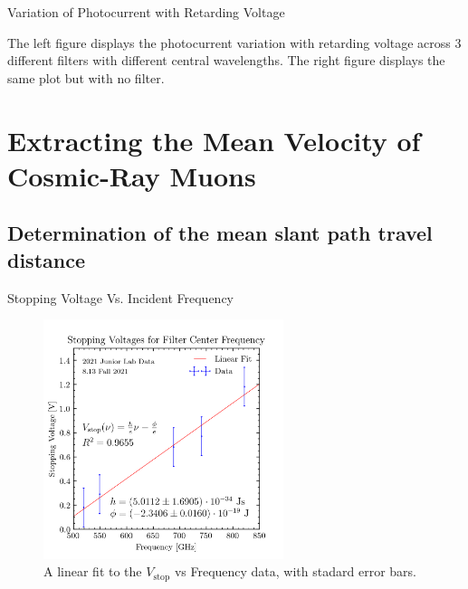 \documentclass[hyperref=pdftex, presentation]{beamer}
\begin{document}
\begin{frame}{Variation of Photocurrent with Retarding Voltage}
\begin{figure}
\begin{minipage}{0.45\textwidth}
	\end{minipage}
\end{figure}
The left figure displays the photocurrent variation with retarding voltage across 3 different filters with different central wavelengths. The right figure displays the same plot but with no filter.
\end{frame}


\section{Extracting the Mean Velocity of Cosmic-Ray Muons}
\subsection{Determination of the mean slant path travel distance}

\begin{frame}{\Large Stopping Voltage Vs. Incident Frequency}
 \begin{figure}
 	\centering
 \includegraphics[height=7cm]{stopping_volts.png}
 \caption{A linear fit to the $V_{\mathrm{stop}}$ vs Frequency data, with stadard error bars. }
 \end{figure}
\end{frame}
\end{document}
